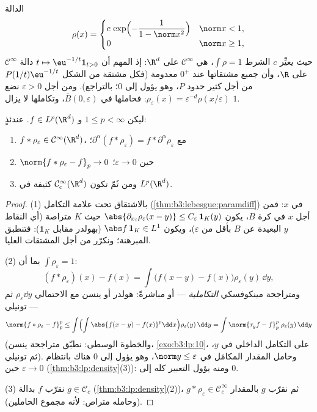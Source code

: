 \begin{definition}\label{def:b3:lp:mollifier}
الدالة
\[
\rho(x) = \begin{cases}
c\,\exp\Bigl(-\dfrac{1}{1 - \norm x^2}\Bigr) & \norm x < 1,\\
0 & \norm x \geq 1,
\end{cases}
\]
حيث يعيِّر $c$ الشرط $\int\rho = 1$، هي $\mathcal C^\infty$ على $\R^d$: إذ
المهم أن $t \mapsto \eu^{-1/t}\mathbf
1_{t>0}$ دالة $\mathcal C^\infty$ على $\R$، وأن جميع مشتقاتها عند
$0^+$ معدومة (فكل مشتقة من الشكل $P(1/t)\eu^{-1/t}$ من أجل كثير حدود $P$،
وهو يؤول إلى $0$؛ بالتراجع). ومن أجل $\varepsilon > 0$ نضع $\rho_\varepsilon(x) =
\varepsilon^{-d}\rho(x/\varepsilon)$: فحاملها
في $\bar B(0,
\varepsilon)$، وتكاملها لا يزال $1$.
\end{definition}

\begin{theorem}[التنظيم]\label{thm:b3:lp:regularization}
ليكن $1 \leq p < \infty$ و $f \in L^p(\R^d)$. عندئذٍ:
\begin{enumerate}
  \item $f * \rho_\varepsilon \in \mathcal C^\infty(\R^d)$،
        مع $\partial^\alpha(f * \rho_\varepsilon) = f *
        \partial^\alpha\rho_\varepsilon$؛
  \item $\norm{f * \rho_\varepsilon - f}_p \to 0$ حين
        $\varepsilon \to 0$؛
  \item ومن ثَمّ تكون $\mathcal C^\infty_c(\R^d)$ كثيفة في
        $L^p(\R^d)$.
\end{enumerate}
\end{theorem}

\begin{proof}
(1) بالاشتقاق تحت علامة التكامل (\cref{thm:b3:lebesgue:paramdiff}) في $x$: فمن أجل
$x$ في كرة $B$، يكون $\abs{\partial_{x_i}\rho_\varepsilon(x - y)} \leq
C_\varepsilon\,\mathbf 1_{K}(y)$ حيث $K$ متراصة (أي النقاط $y$
البعيدة عن $B$ بأقل من $\varepsilon$)، ويكون $\abs f\,\mathbf 1_K \in L^1$ (بهولدر
مقابل $\mathbf 1_K$): فتنطبق المبرهنة؛ ونكرّر من أجل المشتقات
العليا.

(2) بما أن $\int\rho_\varepsilon = 1$:
\[
(f * \rho_\varepsilon)(x) - f(x)
= \int \bigl(f(x - y) - f(x)\bigr)\rho_\varepsilon(y)\,\dd y ,
\]
ومتراجحة مينكوفسكي \emph{التكاملية} --- أو مباشرةً: هولدر أو
ينسن مع  الاحتمالي $\rho_\varepsilon\dd y$ ثم تونيلي ---
\[
\norm{f*\rho_\varepsilon - f}_p^p
\leq \int\Bigl(\int\abs{f(x-y) -
f(x)}^p\dd x\Bigr)\rho_\varepsilon(y)\,\dd y
= \int \norm{\tau_yf - f}_p^p\;\rho_\varepsilon(y)\,\dd y
\]
(والخطوة الوسطى: نطبّق متراجحة ينسن، \cref{exo:b3:lp:10}، على التكامل
الداخلي في $y$، ثم تونيلي). وحامل المقدار المكامَل في $\norm y \leq \varepsilon$،
وهو يؤول إلى $0$ هناك بانتظام حين $\varepsilon \to 0$ (\cref{thm:b3:lp:density}(3)): ومنه
يؤول التعبير كله إلى $0$.

(3) نقرّب $f$ بدالة $g \in \mathcal C_c$ (\cref{thm:b3:lp:density}(2))، ثم نقرّب $g$
بالمقدار $g *
\rho_\varepsilon \in \mathcal C_c^\infty$ (وحامله متراص: لأنه مجموع الحاملين).
\end{proof}

